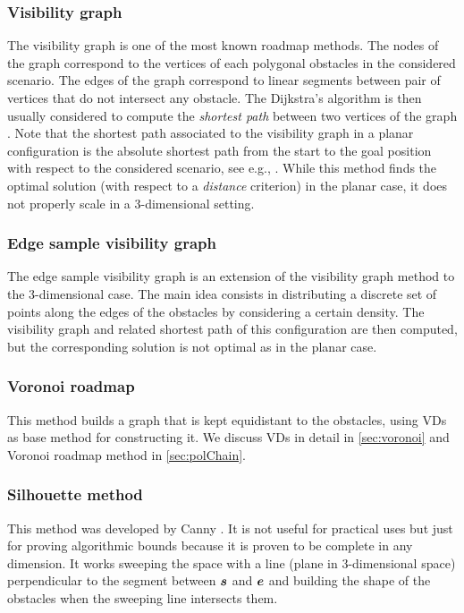 \documentclass[dissertation.tex]{subfiles}
\begin{document}
\subsubsection{Visibility graph}
The visibility graph is one of the most known roadmap methods. The
nodes of the graph correspond to the vertices of each polygonal
obstacles in the considered scenario. The edges of the graph
correspond to linear segments between pair of vertices that do not
intersect any obstacle. The Dijkstra's algorithm is then usually
considered to compute the \emph{shortest path} between two vertices of
the graph \cite{dijkstra}.  Note
that the shortest path associated to the visibility graph in a planar
configuration is the absolute shortest path from the start to the goal
position with respect to the considered scenario, see e.g.,
\cite{deberg}. While this method finds the optimal solution (with respect to a
\emph{distance} criterion) in the planar case, it does not properly
scale in a 3-dimensional setting.

\subsubsection{Edge sample visibility graph}
The edge sample visibility graph is an extension of the visibility
graph method to the 3-dimensional case. The main idea consists in
distributing a discrete set of points along the edges of the obstacles
by considering  a certain density. The visibility graph and related
shortest path of this configuration are then computed, but the
corresponding solution is not optimal as in the planar case.

\subsubsection{Voronoi roadmap}
This method builds a graph that is kept equidistant to the obstacles,
using
\acp{VD} as base method for constructing it. We discuss \acp{VD}
in detail in \cref{sec:voronoi} and Voronoi roadmap method in
\cref{sec:polChain}.

\subsubsection{Silhouette method}
This method was developed by Canny \cite{canny}. It is not useful for
practical uses but just for
proving algorithmic bounds because it is proven to be complete in any
dimension. It works sweeping the space with a line (plane in
3-dimensional space) perpendicular to the
segment between $\boldsymbol{s}$ and $\boldsymbol{e}$ and building the shape of the
obstacles when the sweeping line intersects them.
\end{document}
